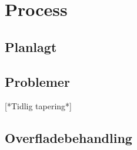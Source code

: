 \section*{Process}
\subsection*{Planlagt}
\subsection*{Problemer}
[*Tidlig tapering*]
\subsection*{Overfladebehandling}
